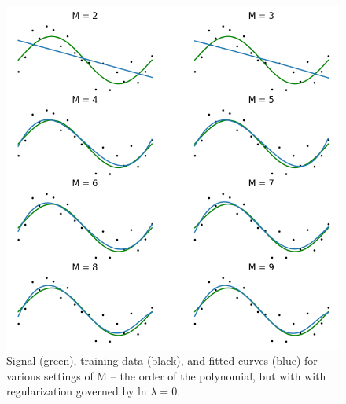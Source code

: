 \documentclass[
  0.875em,
  letterpaper,
  DIV=11,
  numbers=noendperiod]{scrartcl}
\begin{document}
\begin{figure}

{\centering \includegraphics[width=5.20833in,height=\textheight]{./img/map_w.png}

}

\caption{Signal (green), training data (black), and fitted curves (blue)
for various settings of M -- the order of the polynomial, but with with
regularization governed by \(\text{ln } \lambda = 0\).}

\end{figure}
\end{document}
